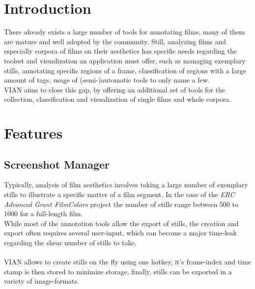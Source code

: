 \documentclass[11pt, a4paper,oneside,chapterprefix=false]{scrbook}
\begin{document}
\section{Introduction} \label{chp:introduction}
 There already exists a large number of tools for annotating films, many of them are mature and well adopted by the community. Still, analyzing films and especially corpora of films on their aesthetics has specific needs regarding the toolset and visualization an application must offer, such as managing exemplary stills, annotating specific regions of a frame, classification of regions with a large amount of tags, usage of (semi-)automatic tools to only name a few. \\
VIAN aims to close this gap, by offering an additional set of tools for the collection, classification and visualization of single films and whole corpora. \\
 

\section{Features} \label{chp:features}
\subsection{Screenshot Manager}
Typically, analysis of film aesthetics involves taking a large number of exemplary stills to illustrate a specific matter of a film segment. In the case of the \textit{ERC Advanced Grant FilmColors} project the number of stills range between 500 to 1000 for a full-length film. \\
While most of the annotation tools allow the export of stills, the creation and export often requires several user-input, which can become a major time-leak regarding the shear number of stills to take.\\
\\
VIAN allows to create stills on the fly using one hotkey, it's frame-index and time stamp is then stored to minimize storage, finally, stills can be exported in a variety of image-formats.
\end{document}
